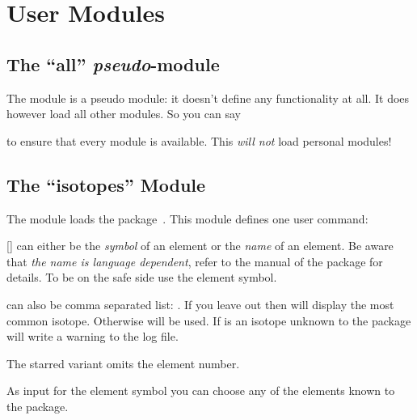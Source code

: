 \documentclass{chemmacros-manual}
\makeatletter
\def\chemmodule*#1{\textquotedblleft#1\textquotedblright}%
\renewenvironment{commands}
  {%
    \let\command\cnltx@command
    \let\explcommand\cnltx@explcommand
    \cnltxlist
  }
  {\endcnltxlist}
\makeatother
\begin{document}
\section{User Modules}
\subsection{The \chemmodule*{all} \emph{pseudo}-module}\label{sec:all-module}

The  module is a pseudo module: it doesn't define any
functionality at all.  It does however load all other modules.  So you can say
\begin{sourcecode}
\end{sourcecode}
to ensure that every module is available.  This \emph{will not} load personal
modules!

\subsection{The \chemmodule*{isotopes} Module}\label{sec:isotopes-module}

The  module loads the 
package~\cite{pkg:elements}.  This module defines one user command:
\begin{commands}
  \command{isotope}[\sarg{}]
     can either be the \emph{symbol} of an element or the
    \emph{name} of an element.  Be aware that \emph{the name is language
      dependent}, refer to the manual of the  package for
    details.  To be on the safe side use the element symbol.

     can also be comma separated list:
    .  If you leave  out
    then  will display the most common isotope.  Otherwise
     will be used.  If  is an isotope unknown to the
     package  will write a warning to the log file.

    The starred variant omits the element number.
\end{commands}

\begin{example}
\end{example}

As input for the element symbol you can choose any of the elements known to
the  package.
\end{document}
